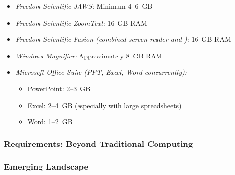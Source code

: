 \begin{itemize}
	\item \emph{Freedom Scientific JAWS:} Minimum 4--6~GB  \supercite{FreedomScientificJAWSRequirements}
	\item \emph{Freedom Scientific ZoomText:} 16~GB RAM \supercite{FreedomScientificZoomTextRequirements}
	\item \emph{Freedom Scientific Fusion (combined screen reader and ):} 16~GB RAM \supercite{FreedomScientificFusionRequirements}
	\item \emph{Windows Magnifier:} Approximately 8~GB RAM \supercite{MicrosoftWindowsAccessibility}
	\item \emph{Microsoft Office Suite (PPT, Excel, Word concurrently):} \supercite{MicrosoftOfficeSystemRequirements}

	      \begin{itemize}
		      \item PowerPoint: 2--3~GB
		      \item Excel: 2--4~GB (especially with large spreadsheets)
		      \item Word: 1--2~GB
	      \end{itemize}

\end{itemize}

\subsubsection{ Requirements: Beyond Traditional Computing}

\subsubsection{Emerging  Landscape}

